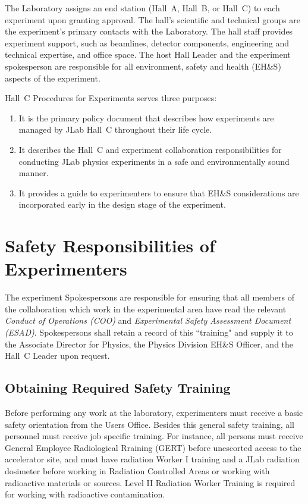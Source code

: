 %
%


The Laboratory assigns an end station (Hall~A, Hall~B, or Hall~C) to 
each experiment
upon granting approval. The hall's scientific and technical groups are the
experiment's primary
contacts with the Laboratory. The hall staff provides experiment support,
such as beamlines,
detector components, engineering and technical expertise, and office space.
The host Hall Leader
and the experiment spokesperson are responsible for all environment, safety
and health
(EH\&S) aspects of the experiment.

Hall~C Procedures for Experiments serves three purposes:
\begin{enumerate}
\item{It is the primary policy document that describes how experiments are
managed by JLab Hall~C throughout their life cycle.}

\item{It describes the Hall~C and experiment collaboration responsibilities
for conducting JLab physics experiments in a safe and environmentally sound 
manner.}

\item{It provides a guide to experimenters to ensure that EH\&S
considerations are incorporated early in the design stage of the 
experiment.}
\end{enumerate}

\section{Safety Responsibilities of Experimenters}


The experiment Spokespersons are responsible for ensuring that all 
members of the collaboration which work in the experimental area have read 
the relevant {\em Conduct of Operations (COO)} and 
{\em Experimental Safety Assessment Document (ESAD)}.  Spokespersons shall 
retain a record of this ``training" and 
supply it to the Associate Director for Physics, the Physics Division EH\&S Officer, and
the Hall~C Leader upon request.

\subsection{Obtaining Required Safety Training}

Before performing any work at the laboratory, experimenters must 
receive a basic safety
orientation from the Users Office. Besides this general safety training,
all personnel must
receive job specific training. For instance, all persons must receive General Employee
Radiological Rraining (GERT) before unescorted access to the accelerator site,
and must have radiation Worker I training and a JLab radiation dosimeter before 
working in Radiation Controlled Areas or working with radioactive materials or sources.
Level II Radiation Worker Training is required for working with radioactive 
contamination.

